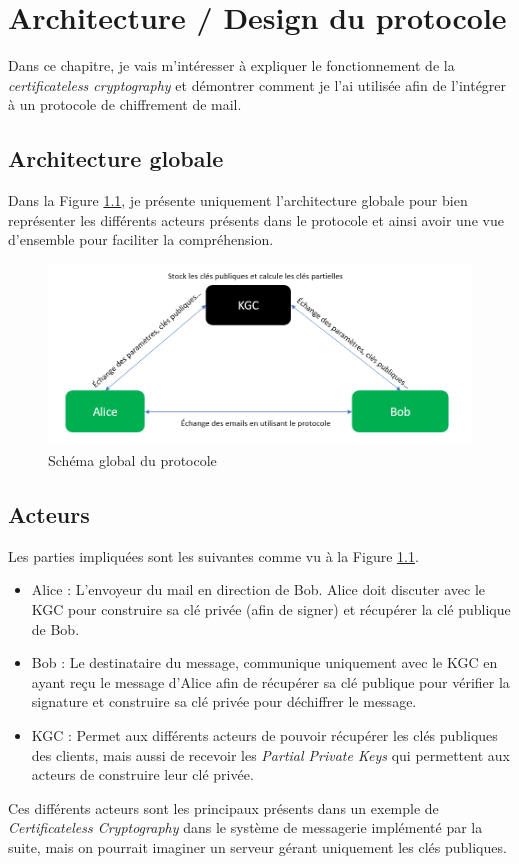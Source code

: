 \chapter{Architecture / Design du protocole}
\label{ch:arch}
Dans ce chapitre, je vais m'intéresser à expliquer le fonctionnement de la \textit{certificateless cryptography} et démontrer comment je l'ai utilisée afin de l'intégrer à un protocole de chiffrement de mail.
\section{Architecture globale}
Dans la Figure \ref{fig:globalProtocol}, je présente uniquement l'architecture globale pour bien représenter les différents acteurs présents dans le protocole et ainsi avoir une vue d'ensemble pour faciliter la compréhension.

\begin{figure}[h!]
	\centering
	\includegraphics[width=14cm]{images/SchemaGlobal.png}
	\caption{Schéma global du protocole}
	\label{fig:globalProtocol}
\end{figure}

\section{Acteurs}
Les parties impliquées sont les suivantes comme vu à la Figure \ref{fig:globalProtocol}.
\begin{itemize}
	\item Alice : L'envoyeur du mail en direction de Bob. Alice doit discuter avec le KGC pour construire sa clé privée (afin de signer) et récupérer la clé publique de Bob.
	\item Bob : Le destinataire du message, communique uniquement avec le KGC en ayant reçu le message d'Alice afin de récupérer sa clé publique pour vérifier la signature et construire sa clé privée pour déchiffrer le message.
	\item KGC : Permet aux différents acteurs de pouvoir récupérer les clés publiques des clients, mais aussi de  recevoir les \textit{Partial Private Keys} qui permettent aux acteurs de construire leur clé privée. 
\end{itemize}
Ces différents acteurs sont les principaux présents dans un exemple de \textit{Certificateless Cryptography} dans le système de messagerie implémenté par la suite, mais on pourrait imaginer un serveur gérant uniquement les clés publiques.

